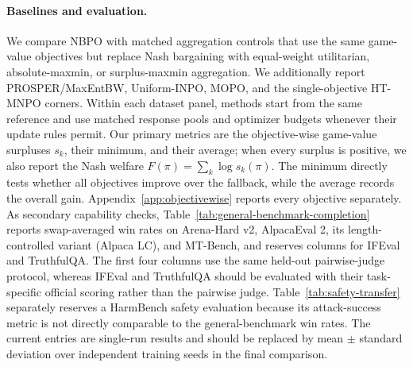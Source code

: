 \documentclass{article}
\theoremstyle{remark}
\theoremstyle{plain}
\newcommand{\NBPO}{\textsc{NBPO}}
\begin{document}
\paragraph{Baselines and evaluation.}
We compare \NBPO{} with matched aggregation controls that use the same game-value objectives but replace Nash bargaining with equal-weight utilitarian, absolute-maxmin, or surplus-maxmin aggregation. We additionally report PROSPER/MaxEntBW, Uniform-INPO, MOPO, and the single-objective HT-MNPO corners. Within each dataset panel, methods start from the same reference and use matched response pools and optimizer budgets whenever their update rules permit. Our primary metrics are the objective-wise game-value surpluses $s_k$, their minimum, and their average; when every surplus is positive, we also report the Nash welfare $F(\pi)=\sum_k\log s_k(\pi)$. The minimum directly tests whether all objectives improve over the fallback, while the average records the overall gain. Appendix~\ref{app:objectivewise} reports every objective separately. As secondary capability checks, Table~\ref{tab:general-benchmark-completion} reports swap-averaged win rates on Arena-Hard v2, AlpacaEval 2, its length-controlled variant (Alpaca LC), and MT-Bench, and reserves columns for IFEval and TruthfulQA. The first four columns use the same held-out pairwise-judge protocol, whereas IFEval and TruthfulQA should be evaluated with their task-specific official scoring rather than the pairwise judge. Table~\ref{tab:safety-transfer} separately reserves a HarmBench safety evaluation because its attack-success metric is not directly comparable to the general-benchmark win rates. The current entries are single-run results and should be replaced by mean $\pm$ standard deviation over independent training seeds in the final comparison.
\end{document}
